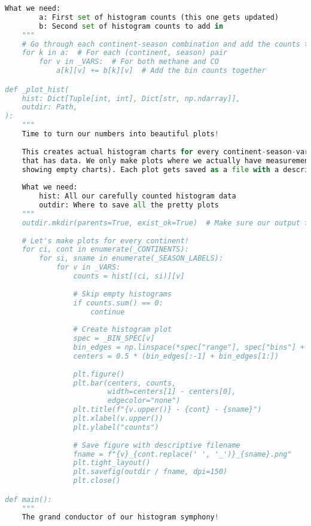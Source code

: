 \begin{lstlisting}[language=Python, caption=Histogram Generation Algorithm, label=alg:step03_histos, breaklines=true]
    What we need:
        a: First set of histogram counts (this one gets updated)
        b: Second set of histogram counts to add in
    """
    # Go through each continent-season combination and add the counts together
    for k in a:  # For each (continent, season) pair
        for v in _VARS:  # For both methane and CO
            a[k][v] += b[k][v]  # Add the bin counts together

def _plot_hist(
    hist: Dict[Tuple[int, int], Dict[str, np.ndarray]],
    outdir: Path,
):
    """
    Time to turn our numbers into beautiful plots!
    
    This creates actual histogram charts for every continent-season-variable combination
    that has data. We only make plots where we actually have measurements (no point in
    showing empty charts). Each plot gets saved as a file with a descriptive name.
    
    What we need:
        hist: All our carefully counted histogram data
        outdir: Where to save all the pretty plots
    """
    outdir.mkdir(parents=True, exist_ok=True)  # Make sure our output folder exists
    
    # Let's make plots for every continent!
    for ci, cont in enumerate(_CONTINENTS):
        for si, sname in enumerate(_SEASON_LABELS):
            for v in _VARS:
                counts = hist[(ci, si)][v]
                
                # Skip empty histograms
                if counts.sum() == 0:
                    continue
                    
                # Create histogram plot
                spec = _BIN_SPEC[v]
                bin_edges = np.linspace(*spec["range"], spec["bins"] + 1)
                centers = 0.5 * (bin_edges[:-1] + bin_edges[1:])
                
                plt.figure()
                plt.bar(centers, counts, 
                        width=centers[1] - centers[0], 
                        edgecolor="none")
                plt.title(f"{v.upper()} - {cont} - {sname}")
                plt.xlabel(v.upper())
                plt.ylabel("counts")
                
                # Save figure with descriptive filename
                fname = f"{v}_{cont.replace(' ', '_')}_{sname}.png"
                plt.tight_layout()
                plt.savefig(outdir / fname, dpi=150)
                plt.close()

def main():
    """
    The grand conductor of our histogram symphony!
    

\end{lstlisting}

